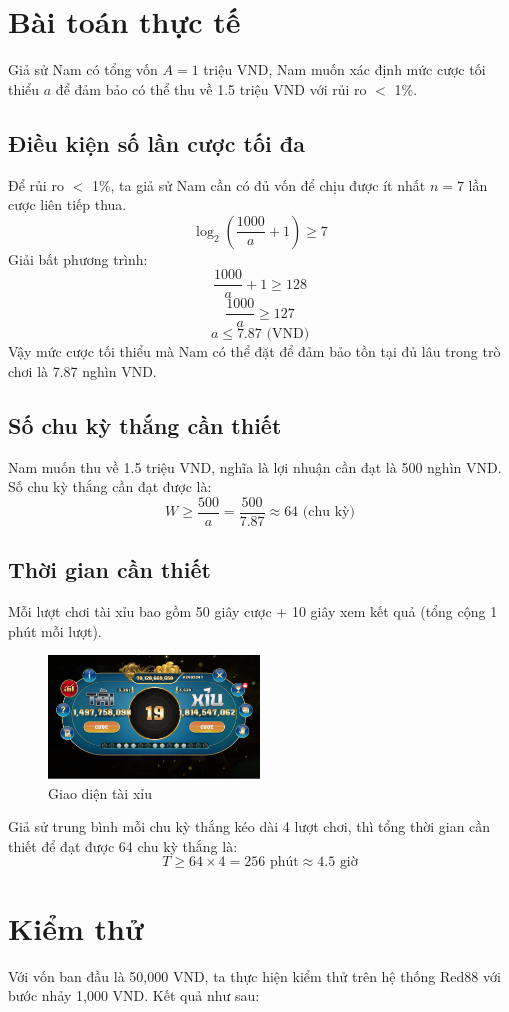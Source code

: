 \documentclass[a4paper,12pt]{article}
\begin{document}
\section{Bài toán thực tế}
Giả sử Nam có tổng vốn $A = 1$ triệu VND, Nam muốn xác định mức cược tối thiểu $a$ để đảm bảo có thể thu về 1.5 triệu VND với rủi ro $<$ 1\%.
\subsection{Điều kiện số lần cược tối đa}
Để rủi ro $<$ 1\%, ta giả sử Nam cần có đủ vốn để chịu được ít nhất $n = 7$ lần cược liên tiếp thua.
\[
\log_2\left(\frac{1000}{a} + 1\right) \geq 7
\]
Giải bất phương trình:
\[
\frac{1000}{a} + 1 \geq 128
\]
\[
\frac{1000}{a} \geq 127
\]
\[
a \leq 7.87 \text{ (VND)}
\]
Vậy mức cược tối thiểu mà Nam có thể đặt để đảm bảo tồn tại đủ lâu trong trò chơi là 7.87 nghìn VND.

\subsection{Số chu kỳ thắng cần thiết}
Nam muốn thu về 1.5 triệu VND, nghĩa là lợi nhuận cần đạt là 500 nghìn VND. Số chu kỳ thắng cần đạt được là:
\[
W \geq \frac{500}{a} = \frac{500}{7.87} \approx 64 \text{ (chu kỳ)}
\]

\subsection{Thời gian cần thiết}
Mỗi lượt chơi tài xỉu bao gồm 50 giây cược + 10 giây xem kết quả (tổng cộng 1 phút mỗi lượt).

\begin{figure}[h]
    \centering
    \includegraphics[width=0.5\textwidth]{giaodien.png}
    \caption{Giao diện tài xỉu}
\end{figure}

Giả sử trung bình mỗi chu kỳ thắng kéo dài 4 lượt chơi, thì tổng thời gian cần thiết để đạt được 64 chu kỳ thắng là:
\[
T \geq 64 \times 4 = 256 \text{ phút} \approx 4.5 \text{ giờ}
\]
\section{Kiểm thử}
Với vốn ban đầu là 50,000 VND, ta thực hiện kiểm thử trên hệ thống Red88 với bước nhảy 1,000 VND. Kết quả như sau:
\end{document}
